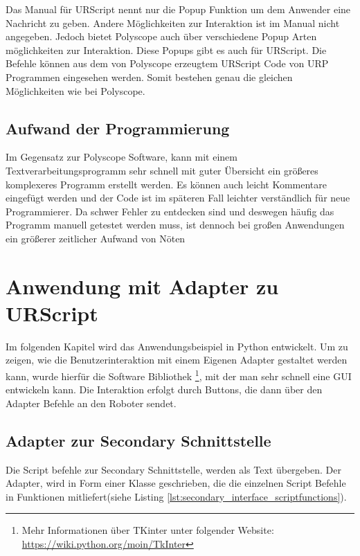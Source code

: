 Das Manual für URScript nennt nur die \ac{Popup} Funktion um dem Anwender eine Nachricht zu geben. Andere Möglichkeiten zur Interaktion ist im Manual nicht angegeben. Jedoch bietet Polyscope auch über verschiedene \ac{Popup} Arten möglichkeiten zur Interaktion. Diese \ac{Popup}s gibt es auch für URScript. Die Befehle können aus dem von Polyscope erzeugtem URScript Code von \ac{URP} Programmen eingesehen werden. Somit bestehen genau die gleichen Möglichkeiten wie bei Polyscope.

\subsection{Aufwand der Programmierung}
\label{ur_script_aufwand}

Im Gegensatz zur Polyscope Software, kann mit einem Textverarbeitungsprogramm sehr schnell mit guter Übersicht ein größeres komplexeres Programm erstellt werden. Es können auch leicht Kommentare eingefügt werden und der Code ist im späteren Fall leichter verständlich für neue Programmierer. Da schwer Fehler zu entdecken sind und deswegen häufig das Programm manuell getestet werden muss, ist dennoch bei großen Anwendungen ein größerer zeitlicher Aufwand von Nöten

\section{Anwendung mit Adapter zu URScript}
\label{sec:script_hoerherer_schicht_rel}

Im folgenden Kapitel wird das Anwendungsbeispiel in Python entwickelt. Um zu zeigen, wie die Benutzerinteraktion mit einem Eigenen Adapter gestaltet werden kann, wurde hierfür die \ac{Software Bibliothek} \footnote{Mehr Informationen über TKinter unter folgender Website: \url{https://wiki.python.org/moin/TkInter}}, mit der man sehr schnell eine \ac{GUI} entwickeln kann. Die Interaktion erfolgt durch Buttons, die dann über den Adapter Befehle an den Roboter sendet.

\subsection{Adapter zur Secondary Schnittstelle}
\label{beschreibung_script_hoeher_schicht}

Die Script befehle zur Secondary Schnittstelle, werden als Text übergeben. Der Adapter, wird in Form einer Klasse geschrieben, die die einzelnen Script Befehle in Funktionen mitliefert(siehe Listing \ref{lst:secondary_interface_scriptfunctions}).

